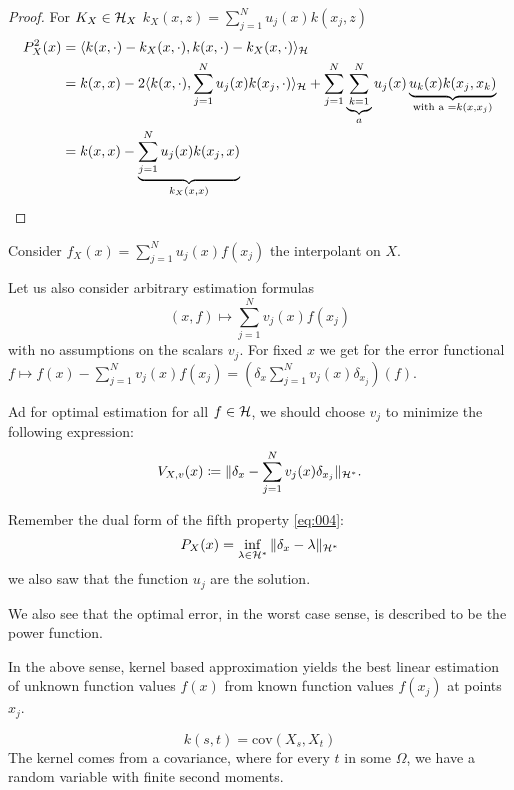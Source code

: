 \begin{proof}
    For $K_X\in \mathcal{H}_X$ $k_X(x,z)=\sum_{j=1}^{N}u_j(x)k(x_j,z)$
    \begin{align*}
        P_X^2(x)&=\langle k(x,\cdot)-k_X(x,\cdot),k(x,\cdot)-k_X(x,\cdot) \rangle_{\mathcal{H}}\\
        &=k(x,x)-2\langle k(x,\cdot),\sum_{j=1}^N u_j(x)k(x_j,\cdot) \rangle_{\mathcal{H}}+\sum_{j=1}^N\underbrace{\sum_{k=1}^{N}}_{a}u_j(x)\underbrace{u_k(x)k(x_j,x_k)}_{\text{with a } =k(x,x_j)}\\
        &=k(x,x)-\underbrace{\sum_{j=1}^N u_j(x)k(x_j,x)}_{k_X(x,x)}\qedhere
    \end{align*}    
\end{proof}

Consider $f_X(x)=\sum_{j=1}^Nu_j(x)f(x_j)$ the interpolant on $X$.

Let us also consider arbitrary estimation formulas 
\[(x,f)\mapsto \sum_{j=1}^N v_j(x)f(x_j)\]
with no assumptions on the scalars $v_j$. For fixed $x$ we get for the 
error functional $f\mapsto f(x)-\sum_{j=1}^{N} v_j(x)f(x_j)=\left(\delta_x \sum_{j=1}^N v_j(x)\delta_{x_j}\right)(f)$.

Ad for optimal estimation for all $f\in\mathcal{H}$, we should choose 
$v_j$ to minimize the following expression:
\[V_{X,v}(x)\coloneqq \Vert \delta_x-\sum_{j=1}^{N} v_j(x)\delta_{x_j}\Vert_{\mathcal{H}^*}.\]

Remember the dual form of the fifth property \ref{eq:004}:
\[P_X(x)=\inf_{\lambda\in\mathcal{H}^*}\Vert \delta_x-\lambda\Vert_{\mathcal{H}^*}\] 
we also saw that the function $u_j$ are the solution.

We also see that the optimal error, in the worst case sense, is described to be the power function.

\begin{theorem}\label{thm:2.5}
    In the above sense, kernel based approximation yields the best linear 
    estimation of unknown function values $f(x)$ from known function values $f(x_j)$
    at points $x_j$.
\end{theorem}







\[k(s,t)=\text{cov}(X_s,X_t)\]
The kernel comes from a covariance, where 
for every $t$ in some $\Omega$, we have a random variable with finite  second moments.

